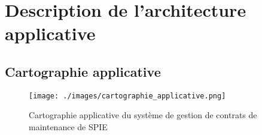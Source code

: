 \chapter{Description de l'architecture applicative}

\section{Cartographie applicative}

\begin{figure}[h]
    \centering
    \texttt{[image: ./images/cartographie\_applicative.png]}
    \caption{Cartographie applicative du système de gestion de contrats de maintenance de SPIE}
    \label{diagram:carto_app}
\end{figure}

\section{}
